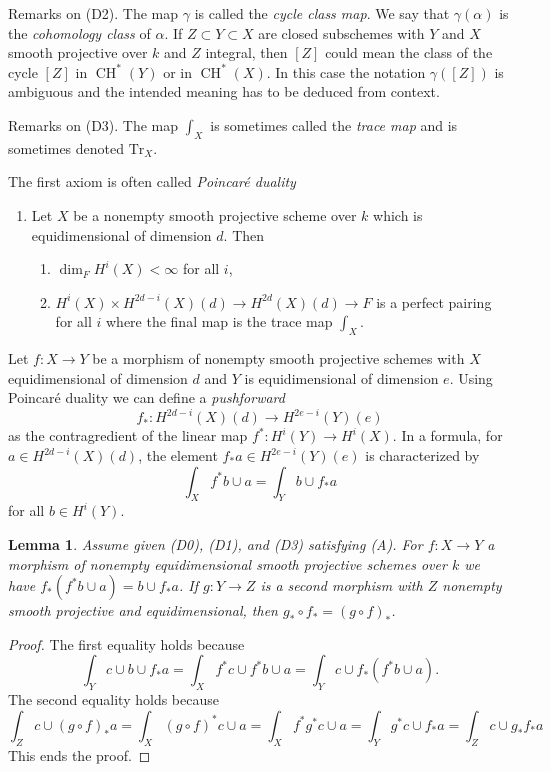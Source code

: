 \documentclass{stacks-project}
\theoremstyle{plain}
\newtheorem{lemma}[subsection]{Lemma}
\theoremstyle{definition}
\theoremstyle{remark}
\numberwithin{equation}{subsection}
\def\CH{\mathop{\mathrm{CH}}\nolimits}
\begin{document}
\medskip\noindent
Remarks on (D2). The map $\gamma$ is called the {\it cycle class map}.
We say that $\gamma(\alpha)$ is the {\it cohomology class} of $\alpha$.
If $Z \subset Y \subset X$ are closed subschemes with $Y$ and $X$
smooth projective over $k$ and $Z$ integral, then $[Z]$ could
mean the class of the cycle $[Z]$ in $\CH^*(Y)$ or in $\CH^*(X)$.
In this case the notation $\gamma([Z])$ is ambiguous and the intended meaning
has to be deduced from context.

\medskip\noindent
Remarks on (D3). The map $\int_X$ is sometimes called the
{\it trace map} and is sometimes denoted $\text{Tr}_X$.

\medskip\noindent
The first axiom is often called {\it Poincar\'e duality}
\begin{enumerate}
\item[(A)] Let $X$ be a nonempty smooth projective scheme over $k$
which is equidimensional of dimension $d$. Then
\begin{enumerate}
\item $\dim_F H^i(X) < \infty$ for all $i$,
\item $H^i(X) \times H^{2d - i}(X)(d) \rightarrow
H^{2d}(X)(d) \rightarrow F$
is a perfect pairing for all $i$ where the final
map is the trace map $\int_X$.
\end{enumerate}
\end{enumerate}
Let $f : X \to Y$ be a morphism of nonempty smooth projective schemes with $X$
equidimensional of dimension $d$ and $Y$ is equidimensional of dimension $e$.
Using Poincar\'e duality we can define a {\it pushforward}
$$
f_* : H^{2d - i}(X)(d) \longrightarrow H^{2e - i}(Y)(e)
$$
as the contragredient of the linear map $f^* : H^i(Y) \to H^i(X)$. In a
formula, for $a \in H^{2d - i}(X)(d)$, the element $f_*a \in H^{2e - i}(Y)(e)$
is characterized by
$$
\int_X f^*b \cup a = \int_Y b \cup f_*a
$$
for all $b \in H^i(Y)$.

\begin{lemma}
\label{lemma-pushforward}
Assume given (D0), (D1), and (D3) satisfying (A). For $f : X \to Y$
a morphism of nonempty equidimensional smooth projective schemes over $k$
we have $f_*(f^*b \cup a) = b \cup f_*a$. If $g : Y \to Z$ is a second morphism
with $Z$ nonempty smooth projective and equidimensional, then
$g_* \circ f_* = (g \circ f)_*$.
\end{lemma}

\begin{proof}
The first equality holds because
$$
\int_Y c \cup b \cup f_*a =
\int_X f^*c \cup f^*b \cup a =
\int_Y c \cup f_*(f^*b \cup a).
$$
The second equality holds because
$$
\int_Z c \cup (g \circ f)_*a = \int_X (g \circ f)^*c \cup a =
\int_X f^* g^* c \cup a = \int_Y g^*c \cup f_*a = \int_Z c \cup g_*f_*a
$$
This ends the proof.
\end{proof}
\end{document}

